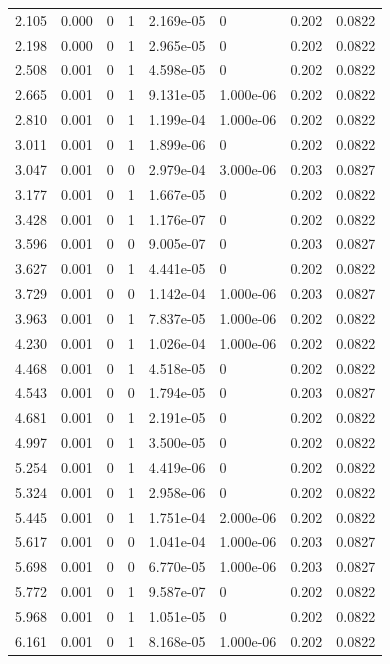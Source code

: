 \documentclass[preview]{standalone}
\begin{document}
{{\begin{tabular}{L{1.2cm}C{1.2cm} C{0.3cm}C{0.5cm} C{1.4cm}C{1.4cm} C{1.4cm}C{1.4cm}}
  2.105  &  0.000  & 0     &  1 &  2.169e-05  & 0  & 0.202 &  0.0822   \\ 
  2.198  &  0.000  & 0     &  1 &  2.965e-05  & 0  & 0.202 &  0.0822   \\ 
  2.508  &  0.001  & 0     &  1 &  4.598e-05  & 0  & 0.202 &  0.0822   \\ 
  2.665  &  0.001  & 0     &  1 &  9.131e-05  & 1.000e-06  & 0.202 &  0.0822   \\ 
  2.810  &  0.001  & 0     &  1 &  1.199e-04  & 1.000e-06  & 0.202 &  0.0822   \\ 
  3.011  &  0.001  & 0     &  1 &  1.899e-06  & 0  & 0.202 &  0.0822   \\ 
  3.047  &  0.001  & 0     &  0 &  2.979e-04  & 3.000e-06  & 0.203 &  0.0827   \\ 
  3.177  &  0.001  & 0     &  1 &  1.667e-05  & 0  & 0.202 &  0.0822   \\ 
  3.428  &  0.001  & 0     &  1 &  1.176e-07  & 0  & 0.202 &  0.0822   \\ 
  3.596  &  0.001  & 0     &  0 &  9.005e-07  & 0  & 0.203 &  0.0827   \\ 
  3.627  &  0.001  & 0     &  1 &  4.441e-05  & 0  & 0.202 &  0.0822   \\ 
  3.729  &  0.001  & 0     &  0 &  1.142e-04  & 1.000e-06  & 0.203 &  0.0827   \\ 
  3.963  &  0.001  & 0     &  1 &  7.837e-05  & 1.000e-06  & 0.202 &  0.0822   \\ 
  4.230  &  0.001  & 0     &  1 &  1.026e-04  & 1.000e-06  & 0.202 &  0.0822   \\ 
  4.468  &  0.001  & 0     &  1 &  4.518e-05  & 0  & 0.202 &  0.0822   \\ 
  4.543  &  0.001  & 0     &  0 &  1.794e-05  & 0  & 0.203 &  0.0827   \\ 
  4.681  &  0.001  & 0     &  1 &  2.191e-05  & 0  & 0.202 &  0.0822   \\ 
  4.997  &  0.001  & 0     &  1 &  3.500e-05  & 0  & 0.202 &  0.0822   \\ 
  5.254  &  0.001  & 0     &  1 &  4.419e-06  & 0  & 0.202 &  0.0822   \\ 
  5.324  &  0.001  & 0     &  1 &  2.958e-06  & 0  & 0.202 &  0.0822   \\ 
  5.445  &  0.001  & 0     &  1 &  1.751e-04  & 2.000e-06  & 0.202 &  0.0822   \\ 
  5.617  &  0.001  & 0     &  0 &  1.041e-04  & 1.000e-06  & 0.203 &  0.0827   \\ 
  5.698  &  0.001  & 0     &  0 &  6.770e-05  & 1.000e-06  & 0.203 &  0.0827   \\ 
  5.772  &  0.001  & 0     &  1 &  9.587e-07  & 0  & 0.202 &  0.0822   \\ 
  5.968  &  0.001  & 0     &  1 &  1.051e-05  & 0  & 0.202 &  0.0822   \\ 
  6.161  &  0.001  & 0     &  1 &  8.168e-05  & 1.000e-06  & 0.202 &  0.0822   \\ 
\hline 
\end{tabular} 

}}
\end{document}
